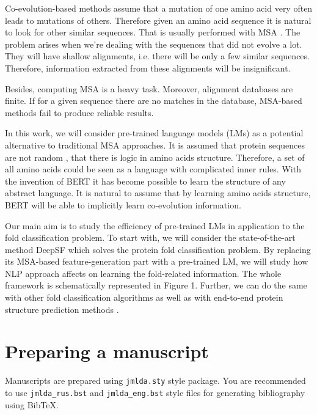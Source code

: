 \documentclass[12pt, twoside]{article}
\begin{document}
 Co-evolution-based methods assume that a mutation of one amino acid very often leads to mutations of others. Therefore given an amino acid sequence it is natural to look for other similar sequences. That is usually performed with MSA \cite{co-evolution}. The problem arises when we’re dealing with the sequences that did not evolve a lot. They will have shallow alignments, i.e. there will be only a few similar sequences. Therefore, information extracted from these alignments will be insignificant. 

Besides, computing MSA is a heavy task. Moreover, alignment databases are finite. If for a given sequence there are no matches in the database, MSA-based methods fail to produce reliable results. 

In this work, we will consider pre-trained language models (LMs)  \cite{Elnaggar} as a potential alternative to traditional MSA approaches. It is assumed that protein sequences are not random \cite{evolution-not-random}, that there is logic in amino acids structure. Therefore, a set of all amino acids could be seen as a language with complicated inner rules. With the invention of BERT \cite{bert} it has become possible to learn the structure of any abstract language. It is natural to assume that by learning amino acids structure, BERT will be able to implicitly learn co-evolution information.

Our main aim is to study the efficiency of pre-trained LMs in application to the fold classification problem.  To start with, we will consider the state-of-the-art method DeepSF \cite{DeepSF} which solves the protein fold classification problem.  By replacing its MSA-based feature-generation part with a pre-trained LM, we will study how NLP approach affects on learning the fold-related information.  The whole framework is schematically represented in Figure 1. Further, we can do the same with other fold classification algorithms \cite{Villegas, DeepFrag}
as well as with end-to-end protein structure prediction methods \cite{Kandathil, Xu2020.10.12.336859}.



\section{Preparing a manuscript}
\noindent
Manuscripts are prepared using \verb'jmlda.sty' style package.
You are recommended to use \verb'jmlda_rus.bst' and \verb'jmlda_eng.bst' style files for generating bibliography using Bib\TeX.
\end{document}
